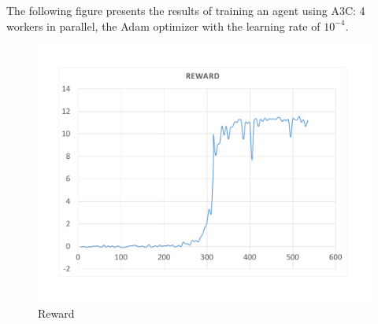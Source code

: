 The following figure presents the results of training an agent using A3C: 4 workers in parallel, the Adam optimizer with the learning rate of $10^{-4}$.
\begin{figure}[H]
	\centering
	\includegraphics[width=\textwidth]{Figures/Reward}
	\caption{Reward}
	\label{fig:Reward}
\end{figure}
